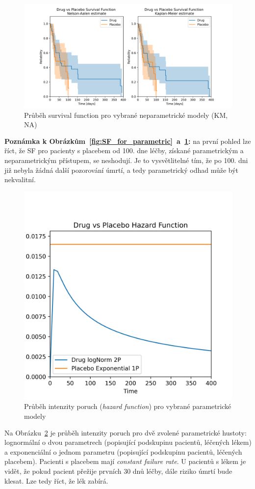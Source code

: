 \documentclass[a4, 11pt]{article}
\theoremstyle{definition}
\theoremstyle{remark}
\begin{document}
   	\begin{figure}[H]
        \centering
        \includegraphics[width=0.9\linewidth]{img/survival_function_drug_vs_placebo_NON_parametric.png}
        \caption{Průběh survival function pro vybrané neparametrické modely (KM, NA)}
        \label{fig:SF_for_nonparametric}
    \end{figure}    
    
    \textbf{Poznámka k Obrázkům~\ref{fig:SF_for_parametric}~a~\ref{fig:SF_for_nonparametric}:} na první pohled lze říct, že SF pro pacienty s placebem od 100. dne léčby, získané parametrickým a neparametrickým přístupem, se neshodují. Je to vysvětlitelné tím, že po 100. dni již nebyla žádná další pozorování úmrtí, a tedy parametrický odhad může být nekvalitní.
    
   	\begin{figure}[H]
        \centering
        \includegraphics[width=0.5\linewidth]{img/hazard_rate_drug_vs_placebo_parametric_my_choice.png}
        \caption{Průběh intenzity poruch (\textit{hazard function}) pro vybrané parametrické modely}
        \label{fig:HF_for_parametric}
    \end{figure} 
    
    Na Obrázku~\ref{fig:HF_for_parametric} je průběh intenzity poruch pro dvě zvolené parametrické hustoty: lognormální o dvou parametrech (popisující podskupinu pacientů, léčených lékem) a exponenciální o jednom parametru (popisující podskupinu pacientů, léčených placebem).
    Pacienti s placebem mají \textit{constant failure rate}. U pacientů s lékem je vidět, že pokud pacient přežije prvních 30 dnů léčby, dále riziko úmrtí bude klesat. Lze tedy říct, že lék zabírá.
    
\end{document}
